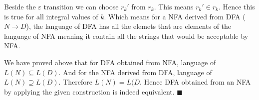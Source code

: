 \documentclass[a4paper]{exam}
\begin{document}
\begin{questions}
\begin{solution}
		Beside the \(\varepsilon\) transition we can choose \(r_k'\) from \(r_k\). This means \(r_k'\in r_k\). Hence this is true for all integral values of \(k\). Which means for a NFA derived from DFA (\(N\rightarrow D\)), the language of DFA has all the elemets that are elements of the language of NFA meaning it contain all the strings that would be acceptable by NFA.

		We have proved above that for DFA obtained from NFA, language of \(L(N)\subseteq L(D)\). And for the NFA derived from DFA, language of \(L(N)\supseteq L(D)\). Therefore \(L(N)=L(D\). Hence DFA obtained from an NFA by applying the given construction is indeed equivalent. \(\blacksquare\)
	\end{solution}
\end{questions}
\end{document}
